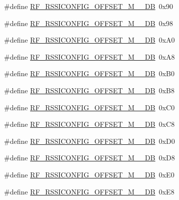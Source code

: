 \begin{DoxyCompactItemize}
\#define \hyperlink{sx1276Regs-Fsk_8h_abbd9ed83c6fbecfcce7c527e34d04ec0}{R\+F\+\_\+\+R\+S\+S\+I\+C\+O\+N\+F\+I\+G\+\_\+\+O\+F\+F\+S\+E\+T\+\_\+\+M\+\_\+\_\+\+DB}~0x90
\item 
\#define \hyperlink{sx1276Regs-Fsk_8h_ae0e47dc6a207da992b1ac902a110f9d7}{R\+F\+\_\+\+R\+S\+S\+I\+C\+O\+N\+F\+I\+G\+\_\+\+O\+F\+F\+S\+E\+T\+\_\+\+M\+\_\+\_\+\+DB}~0x98
\item 
\#define \hyperlink{sx1276Regs-Fsk_8h_a3e5e74a8043abbe4a998705c64a85970}{R\+F\+\_\+\+R\+S\+S\+I\+C\+O\+N\+F\+I\+G\+\_\+\+O\+F\+F\+S\+E\+T\+\_\+\+M\+\_\+\_\+\+DB}~0x\+A0
\item 
\#define \hyperlink{sx1276Regs-Fsk_8h_aba0e0493c2206484248dda87b2ca7134}{R\+F\+\_\+\+R\+S\+S\+I\+C\+O\+N\+F\+I\+G\+\_\+\+O\+F\+F\+S\+E\+T\+\_\+\+M\+\_\+\_\+\+DB}~0x\+A8
\item 
\#define \hyperlink{sx1276Regs-Fsk_8h_ac5d1af16b9ab32202350604e20ff97ca}{R\+F\+\_\+\+R\+S\+S\+I\+C\+O\+N\+F\+I\+G\+\_\+\+O\+F\+F\+S\+E\+T\+\_\+\+M\+\_\+\_\+\+DB}~0x\+B0
\item 
\#define \hyperlink{sx1276Regs-Fsk_8h_adc8551bf57dfe63c6f6f5ae1610dfb90}{R\+F\+\_\+\+R\+S\+S\+I\+C\+O\+N\+F\+I\+G\+\_\+\+O\+F\+F\+S\+E\+T\+\_\+\+M\+\_\+\_\+\+DB}~0x\+B8
\item 
\#define \hyperlink{sx1276Regs-Fsk_8h_a2974c4a75b7464841728fb56d662743b}{R\+F\+\_\+\+R\+S\+S\+I\+C\+O\+N\+F\+I\+G\+\_\+\+O\+F\+F\+S\+E\+T\+\_\+\+M\+\_\+\_\+\+DB}~0x\+C0
\item 
\#define \hyperlink{sx1276Regs-Fsk_8h_a90e12bf75d247cefc76360f6b6b65c36}{R\+F\+\_\+\+R\+S\+S\+I\+C\+O\+N\+F\+I\+G\+\_\+\+O\+F\+F\+S\+E\+T\+\_\+\+M\+\_\+\_\+\+DB}~0x\+C8
\item 
\#define \hyperlink{sx1276Regs-Fsk_8h_ad7061fda6354ecec243b4cf450f80fdf}{R\+F\+\_\+\+R\+S\+S\+I\+C\+O\+N\+F\+I\+G\+\_\+\+O\+F\+F\+S\+E\+T\+\_\+\+M\+\_\+\_\+\+DB}~0x\+D0
\item 
\#define \hyperlink{sx1276Regs-Fsk_8h_a9231b5019a52af5f09d67e4f0c76b681}{R\+F\+\_\+\+R\+S\+S\+I\+C\+O\+N\+F\+I\+G\+\_\+\+O\+F\+F\+S\+E\+T\+\_\+\+M\+\_\+\_\+\+DB}~0x\+D8
\item 
\#define \hyperlink{sx1276Regs-Fsk_8h_a3c584e4445cc29c7ea1faa931383f5bf}{R\+F\+\_\+\+R\+S\+S\+I\+C\+O\+N\+F\+I\+G\+\_\+\+O\+F\+F\+S\+E\+T\+\_\+\+M\+\_\+\_\+\+DB}~0x\+E0
\item 
\#define \hyperlink{sx1276Regs-Fsk_8h_a931a618c3206621f7a13ed8e2b7dfc85}{R\+F\+\_\+\+R\+S\+S\+I\+C\+O\+N\+F\+I\+G\+\_\+\+O\+F\+F\+S\+E\+T\+\_\+\+M\+\_\+\_\+\+DB}~0x\+E8
\item 

\end{DoxyCompactItemize}
